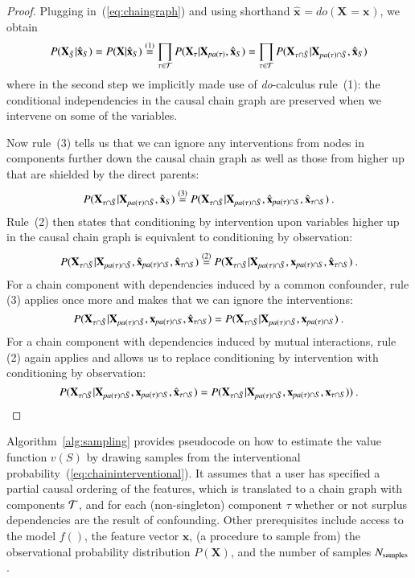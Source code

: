 \documentclass{article}
\newcommand{\vX}{\mathbf{X}}
\newcommand{\vx}{\mathbf{x}}
\newcommand{\val}{{v}}
\newcommand{\dodo}{\mathit{do}}
\newcommand{\lvdo}[1]{\dodo(\vX_{#1} = \vx_{#1})}
\newcommand{\svdo}[1]{\hat{\vx}_{#1}}
\newcommand{\spa}{\mathop{\textit{\scriptsize pa}}}
\newcommand{\onder}[2]{{#1}_{\mbox{\scriptsize #2}}}
\newcommand{\chaincomponents}{{\cal T}}
\newcommand{\isequaldono}[1]{\overset{(#1)}{=}}
\begin{document}
\begin{proof}
Plugging in~(\ref{eq:chaingraph}) and using shorthand $\svdo{} = \lvdo{}$, we obtain
\[
P(\vX_{\bar{S}}|\svdo{S}) = P(\vX|\svdo{S})
\isequaldono{1} \prod_{\tau \in \chaincomponents} P(\vX_\tau|\vX_{\spa(\tau)},\svdo{S}) = \prod_{\tau \in \chaincomponents} P(\vX_{\tau \cap \bar{S}}|\vX_{\spa(\tau)  \cap \bar{S}},\svdo{S})
\]
where in the second step we implicitly made use of {\em do}-calculus rule~(1): the conditional independencies in the causal chain graph are preserved when we intervene on some of the variables.

Now rule~(3) tells us that we can ignore any interventions from nodes in components further down the causal chain graph as well as those from higher up that are shielded by the direct parents:
\[
P(\vX_{\tau \cap \bar{S}}|\vX_{\spa(\tau)  \cap \bar{S}},\svdo{S})
\isequaldono{3} P(\vX_{\tau \cap \bar{S}}|\vX_{\spa(\tau)  \cap \bar{S}},\svdo{\spa(\tau) \cap S},\svdo{\tau \cap S}) \: .
\]
Rule~(2) then states that conditioning by intervention upon variables higher up in the causal chain graph is equivalent to conditioning by observation:
\[
P(\vX_{\tau \cap \bar{S}}|\vX_{\spa(\tau)  \cap \bar{S}},\svdo{\spa(\tau) \cap S},\svdo{\tau \cap S}) \isequaldono{2}
P(\vX_{\tau \cap \bar{S}}|\vX_{\spa(\tau)  \cap \bar{S}},\vx_{\spa(\tau) \cap S},\svdo{\tau \cap S}) \: .
\]
For a chain component with dependencies induced by a common confounder, rule (3) applies once more and makes that we can ignore the interventions:
\[
P(\vX_{\tau \cap \bar{S}}|\vX_{\spa(\tau)  \cap \bar{S}},\vx_{\spa(\tau) \cap S},\svdo{\tau \cap S}) = P(\vX_{\tau \cap \bar{S}}|\vX_{\spa(\tau)  \cap \bar{S}},\vx_{\spa(\tau) \cap S}) \: .
\]
For a chain component with dependencies induced by mutual interactions, rule (2) again applies and allows us to replace conditioning by intervention with conditioning by observation:
\[
P(\vX_{\tau \cap \bar{S}}|\vX_{\spa(\tau)  \cap \bar{S}},\vx_{\spa(\tau) \cap S},\svdo{\tau \cap S}) = P(\vX_{\tau \cap \bar{S}}|\vX_{\spa(\tau)  \cap \bar{S}},\vx_{ \spa(\tau) \cap S},\vx_{\tau \cap S})) \: .
\]
\end{proof}

Algorithm~\ref{alg:sampling} provides pseudocode on how to estimate the value function $\val(S)$ by drawing samples from the interventional probability~(\ref{eq:chaininterventional}). It assumes that a user has specified a partial causal ordering of the features, which is translated to a chain graph with components $\chaincomponents$, and for each (non-singleton) component $\tau$ whether or not surplus dependencies are the result of confounding. Other prerequisites include access to the model $f()$, the feature vector $\vx$, (a procedure to sample from) the observational probability distribution $P(\vX)$, and the number of samples $\onder{N}{samples}$.
\end{document}
